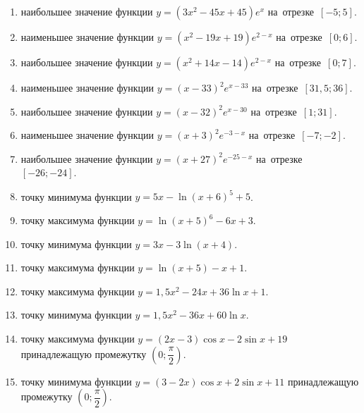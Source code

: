 \documentclass[a4paper,10pt]{article}
\begin{document}
\begin{enumerate}
\item {} наибольшее значение функции $y=\left(3x^2 -45x +45\right)e^{x}$ на~отрезке~$\left[-5;5\right]$.

\item {} наименьшее значение функции $y=\left(x^2 -19x +19\right)e^{2-x}$ на~отрезке~$\left[0;6\right]$.

\item {} наибольшее значение функции $y=\left(x^2 +14x -14\right)e^{2-x}$ на~отрезке~$\left[0;7\right]$.

\item {} наименьшее значение функции $y=\left(x-33\right)^2e^{x-33}$ на~отрезке~$\left[31,5;36\right]$.

\item {} наибольшее значение функции $y=\left(x-32\right)^2e^{x-30}$ на~отрезке~$\left[1;31\right]$.

\item {} наименьшее значение функции $y=\left(x+3\right)^2e^{-3-x}$ на~отрезке~$\left[-7;-2\right]$.

\item {} наибольшее значение функции $y=\left(x+27\right)^2e^{-25-x}$ на~отрезке~$\left[-26;-24\right]$.

\item {} точку минимума функции $y=5x-\ln\left(x+6\right)^{5}+5$.

\item {} точку максимума функции $y=\ln\left(x+5\right)^{6}-6x+3$.

\item {} точку минимума функции $y=3x-3\ln\left(x+4\right)$.

\item {} точку максимума функции $y=\ln\left(x+5\right)-x+1$.

\item {} точку максимума функции $y=1,5x^2-24x+36\ln x +1$.

\item {} точку минимума функции $y=1,5x^2-36x+60\ln x $.

\item {} точку максимума функции $y=\left(2x-3\right)\cos x -2\sin x+19$
принадлежащую промежутку $\left(0;\dfrac{\pi}{2}\right)$.

\item {} точку минимума функции $y=\left(3-2x\right)\cos x +2\sin x+11$
принадлежащую промежутку $\left(0;\dfrac{\pi}{2}\right)$.


\end{enumerate}
\end{document}
